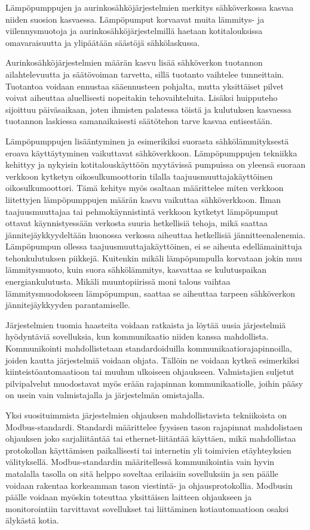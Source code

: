 Lämpöpumppujen ja aurinkosähköjärjestelmien merkitys sähköverkossa kasvaa niiden suosion kasvaessa. Lämpöpumput korvaavat muita lämmitys- ja viilennysmuotoja ja aurinkosähköjärjestelmillä haetaan kotitalouksissa omavaraisuutta ja ylipäätään säästöjä sähkölaskussa. 

Aurinkosähköjärjestelmien määrän kasvu lisää sähköverkon tuotannon ailahtelevuutta ja säätövoiman tarvetta, sillä tuotanto vaihtelee tunneittain. Tuotantoa voidaan ennustaa sääennusteen pohjalta, mutta yksittäiset pilvet voivat aiheuttaa aluellisesti nopeitakin tehovaihteluita. Lisäksi huipputeho sijoittuu päiväsaikaan, joten ihmisten palatessa töistä ja kulutuksen kasvaessa tuotannon laskiessa samanaikaisesti säätötehon tarve kasvaa entisestään. 

Lämpöpumppujen lisääntyminen ja esimerikiksi suorasta sähkölämmityksestä eroava käyttäytyminen vaikuttavat sähköverkkoon. Lämpöpumppujen tekniikka kehittyy ja nykyisin kotitalouskäyttöön myytävissä pumpuissa on yleensä suoraan verkkoon kytketyn oikosulkumoottorin tilalla taajuusmuuttajakäyttöinen oikosulkumoottori. Tämä kehitys myös osaltaan määrittelee miten verkkoon liitettyjen lämpöpumppujen määrän kasvu vaikuttaa sähköverkkoon. Ilman taajuusmuuttajaa tai pehmokäynnistintä verkkoon kytketyt lämpöpumput ottavat käynnistyessään verkosta suuria hetkellisiä tehoja, mikä saattaa jännitejäykkyydeltään huonossa verkossa aiheuttaa hetkellisiä jännitteenalenemia. Lämpöpumpun ollessa taajuusmuuttajakäyttöinen, ei se aiheuta edellämainittuja tehonkulutuksen piikkejä. Kuitenkin mikäli lämpöpumpulla korvataan jokin muu lämmitysmuoto, kuin suora sähkölämmitys, kasvattaa se kulutuspaikan energiankulutusta. Mikäli muuntopiirissä moni talous vaihtaa lämmitysmuodokseen lämpöpumpun, saattaa se aiheuttaa tarpeen sähköverkon jännitejäykkyyden parantamiselle.

Järjestelmien tuomia haasteita voidaan ratkaista ja löytää uusia järjestelmiä hyödyntäviä sovelluksia, kun kommunikaatio niiden kanssa mahdollista. Kommunikointi mahdollistetaan standardoiduilla kommunikaatiorajapinnoilla, joiden kautta järjestelmiä voidaan ohjata. Tällöin ne voidaan kytkeä esimerkiksi kiinteistöautomaatioon tai muuhun ulkoiseen ohjaukseen. Valmistajien suljetut pilvipalvelut muodostavat myös erään rajapinnan kommunikaatiolle, joihin pääsy on usein vain valmistajalla ja järjestelmän omistajalla. 

Yksi suosituimmista järjestelmien ohjauksen mahdollistavista tekniikoista on Modbus-standardi. Standardi määrittelee fyysisen tason rajapinnat mahdolistaen ohjauksen joko sarjaliitäntää tai ethernet-liitäntää käyttäen, mikä mahdollistaa protokollan käyttämisen paikallisesti tai internetin yli toimivien etäyhteyksien välityksellä. Modbus-standardin määritellessä kommunikointia vain hyvin matalalla tasolla on sitä helppo soveltaa erilaisiin sovelluksiin ja sen päälle voidaan rakentaa korkeamman tason viestintä- ja ohjausprotokollia. Modbusin päälle voidaan myöskin toteuttaa yksittäisen laitteen ohjaukseen ja monitorointiin tarvittavat sovellukset tai liittäminen kotiautomaatioon osaksi älykästä kotia. 

